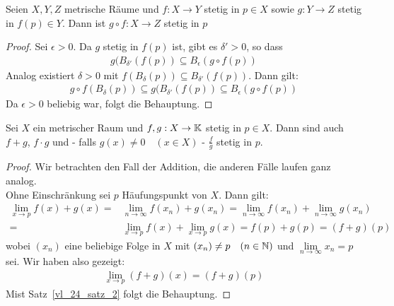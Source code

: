 \begin{Proposition}%
		Seien $X,Y,Z$ metrische Räume und $f: X \rightarrow Y$ stetig in $p \in X$ 
		sowie $g: Y \rightarrow Z$ stetig in $f(p) \in Y$. Dann ist 
		$g \circ f: X \rightarrow Z$ stetig in $p$
\end{Proposition}

\begin{proof}
	Sei $\epsilon >0$. Da $g$ stetig in $f(p)$ ist, gibt es $\delta' > 0$, 
	so dass
	\begin{align*}
		g(B_{\delta'}(f(p)) \subseteq B_\epsilon(g \circ f(p))
	\end{align*}
	Analog existiert $\delta > 0$ mit $f(B_\delta(p)) \subseteq B_{\delta'}
	(f(p))$. Dann gilt:
	\begin{align*}
		g \circ f (B_\delta(p)) \subseteq g(B_{\delta'}(f(p)) 
		\subseteq B_\epsilon(g\circ f(p))
	\end{align*}
	Da $\epsilon > 0$ beliebig war, folgt die Behauptung.
\end{proof}

\begin{Proposition}{\label{vl_24_prop_2}%
	Sei $X$ ein metrischer Raum und $f,g : X \rightarrow \mathbb{K}$ stetig in $p \in X$. 
	Dann sind auch $f + g$, $f \cdot g$  und - falls $g(x) \neq 0 \quad (x \in X)$ 
	- $\frac{f}{g}$ stetig in $p$.
}\end{Proposition}

\begin{proof}
	Wir betrachten den Fall der Addition, die anderen Fälle laufen ganz analog. \\
	Ohne Einschränkung sei $p$ Häufungspunkt von $X$. Dann gilt:
	\begin{align*}
		\lim\limits_{x \rightarrow p}{f(x) +g(x)} = & 
		\lim\limits_{n \rightarrow \infty} f(x_n) + g(x_n) = 
		\lim\limits_{n \rightarrow \infty}{f(x_n)} 
		+ \lim\limits_{n \rightarrow \infty} g(x_n) \\ = &
		\lim\limits_{x \rightarrow p}f(x) + \lim\limits_{x \rightarrow p} g(x)
		= f(p) +g(p) = (f+g)(p)
	\end{align*}
	wobei $(x_n)$ eine beliebige Folge in $X$ mit $(x_n) \neq p \quad (n \in \mathbb{N})$
	und $\lim\limits_{n \rightarrow \infty}{x_n} = p$ sei. Wir haben also gezeigt:
	\begin{align*}
		\lim\limits_{x \rightarrow p}{(f+g)(x)} = (f+g)(p)
	\end{align*}	
	Mist Satz~\ref{vl_24_satz_2} folgt die Behauptung. 
\end{proof}

